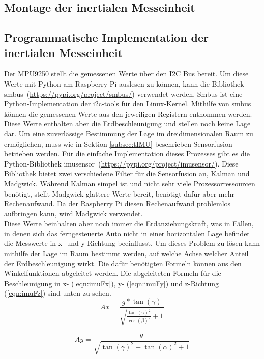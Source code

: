 \subsection{Montage der inertialen Messeinheit}
\label{subsec:IMUmount}

\subsection{Programmatische Implementation der inertialen Messeinheit}
\label{subsec:IMUprogram}
Der MPU9250 stellt die gemessenen Werte über den \ac{I2C} Bus bereit. Um diese Werte mit Python am Raspberry Pi auslesen zu können, kann die Bibliothek \glqq smbus\grqq \ (\url{https://pypi.org/project/smbus/}) verwendet werden. Smbus ist eine Python-Implementation der i2c-tools für den Linux-Kernel. Mithilfe von smbus können die gemessenen Werte aus den jeweiligen Registern entnommen werden. Diese Werte enthalten aber die Erdbeschleunigung und stellen noch keine Lage dar. Um eine zuverlässige Bestimmung der Lage im dreidimensionalen Raum zu ermöglichen, muss wie in Sektion \ref{subsec:tIMU} beschrieben Sensorfusion betrieben werden. Für die einfache Implementation dieses Prozesses gibt es die Python-Bibliothek \glqq imusensor\grqq \ (\url{https://pypi.org/project/imusensor/}). Diese Bibliothek bietet zwei verschiedene Filter für die Sensorfusion an, Kalman und Madgwick. Während Kalman simpel ist und nicht sehr viele Prozessorressourcen benötigt, stellt Madgwick glattere Werte bereit, benötigt dafür aber mehr Rechenaufwand. Da der Raspberry Pi diesen Rechenaufwand problemlos aufbringen kann, wird Madgwick verwendet. \\
Diese Werte beinhalten aber noch immer die Erdanziehungskraft, was in Fällen, in denen sich das ferngesteuerte Auto nicht in einer horizontalen Lage befindet die Messwerte in x- und y-Richtung beeinflusst. Um dieses Problem zu lösen kann mithilfe der Lage im Raum bestimmt werden, auf welche Achse welcher Anteil der Erdbeschleunigung  wirkt. Die dafür benötigten Formeln können aus den Winkelfunktionen abgeleitet werden.
Die abgeleiteten Formeln für die Beschleunigung in x- (\ref{eqn:imuFx}), y- (\ref{eqn:imuFy}) und z-Richtung (\ref{eqn:imuFz}) sind unten zu sehen.
\begin{equation}
Ax=\frac{g*\tan(\gamma)}{\sqrt{\frac{\tan(\gamma)^2}{\cos(\beta)^2}+1}}
\label{eqn:imuFx}
\end{equation}

\begin{equation}
Ay=\frac{g}{\sqrt{\tan(\gamma)^2+\tan(\alpha)^2+1}}
\label{eqn:imuFy}
\end{equation}

